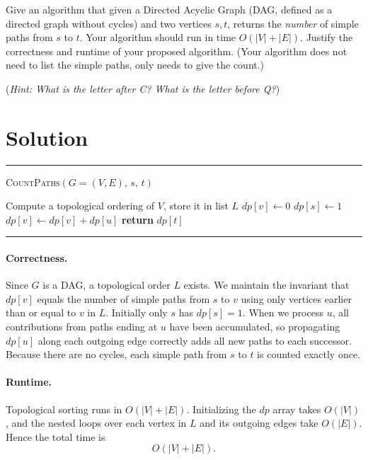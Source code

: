 \documentclass[11pt]{article}
\begin{document}
    \newpage
    \begin{tcolorbox}[title={Problem 4 (Number of Simple Paths, 30 pts)}] \setlength\parindent{1em}
        Give an algorithm that given a Directed Acyclic Graph (DAG, defined as a directed graph without cycles) and two vertices $s,t$, returns the \emph{number} of simple paths from $s$ to $t$. Your algorithm should run in time $O(|V|+|E|)$. Justify the correctness and runtime of your proposed algorithm. (Your algorithm does not need to list the simple paths, only needs to give the count.)

        (\emph{Hint: What is the letter after C? What is the letter before Q?})
    \end{tcolorbox}
    \section*{Solution}

    \par\noindent\rule{\textwidth}{0.4pt}
    \smallskip
    \textsc{CountPaths}$(G=(V,E),\,s,\,t)$
    \begin{algorithmic}[1]
        \STATE Compute a topological ordering of $V$, store it in list $L$
            \STATE $\mathit{dp}[v]\gets 0$
        \ENDFOR
        \STATE $\mathit{dp}[s]\gets 1$
                \STATE $\mathit{dp}[v]\gets \mathit{dp}[v] + \mathit{dp}[u]$
            \ENDFOR
        \ENDFOR
        \STATE \textbf{return} $\mathit{dp}[t]$
    \end{algorithmic}
    \vspace{-2mm}
    \par\noindent\rule{\textwidth}{0.4pt}
    
    \paragraph{Correctness.}  
    Since $G$ is a DAG, a topological order $L$ exists.  We maintain the invariant that $\mathit{dp}[v]$ equals the number of simple paths from $s$ to $v$ using only vertices earlier than or equal to $v$ in $L$.  Initially only $s$ has $\mathit{dp}[s]=1$.  When we process $u$, all contributions from paths ending at $u$ have been accumulated, so propagating $\mathit{dp}[u]$ along each outgoing edge correctly adds all new paths to each successor.  Because there are no cycles, each simple path from $s$ to $t$ is counted exactly once.
    
    \paragraph{Runtime.}  
    Topological sorting runs in $O(|V|+|E|)$.  Initializing the $\mathit{dp}$ array takes $O(|V|)$, and the nested loops over each vertex in $L$ and its outgoing edges take $O(|E|)$.  Hence the total time is
    \[
      O(|V|+|E|).
    \]
\end{document}
